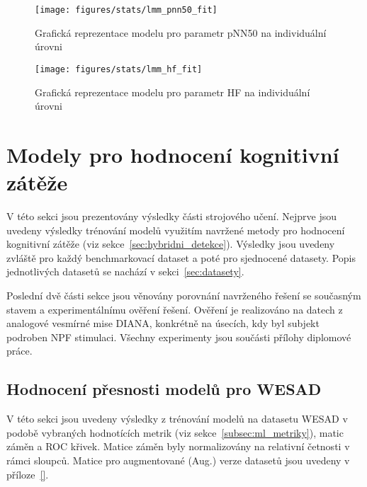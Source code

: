 \begin{figure}[!htb]
    \begin{center}
        \texttt{[image: figures/stats/lmm\_pnn50\_fit]}
        \caption{Grafická reprezentace modelu pro parametr pNN50 na individuální úrovni}
        \label{fig:results_lmm_fit3}
    \end{center}
\end{figure}

\begin{figure}[!htb]
    \begin{center}
        \texttt{[image: figures/stats/lmm\_hf\_fit]}
        \caption{Grafická reprezentace modelu pro parametr HF na individuální úrovni}
        \label{fig:results_lmm_fit4}
    \end{center}
\end{figure}



\section{Modely pro hodnocení kognitivní zátěže}
\label{sec:vysledky_detekce_cl}
V této sekci jsou prezentovány výsledky části strojového učení. Nejprve jsou
uvedeny výsledky trénování modelů využitím navržené metody pro hodnocení
kognitivní zátěže (viz sekce~\ref{sec:hybridni_detekce}). Výsledky jsou uvedeny
zvláště pro každý benchmarkovací dataset a poté pro sjednocené datasety. Popis
jednotlivých datasetů se nachází v sekci~\ref{sec:datasety}.

Poslední dvě části sekce jsou věnovány porovnání navrženého řešení se současným
stavem a experimentálnímu ověření řešení. Ověření je realizováno na datech z
analogové vesmírné mise DIANA, konkrétně na úsecích, kdy byl subjekt podroben
\gls{NPF} stimulaci. Všechny experimenty jsou součásti přílohy diplomové práce.

\subsection{Hodnocení přesnosti modelů pro WESAD}
\label{subsec:wesad_models}
V této sekci jsou uvedeny výsledky z trénování modelů na datasetu WESAD v podobě
vybraných hodnotících metrik (viz sekce~\ref{subsec:ml_metriky}), matic záměn a
ROC křivek. Matice záměn byly normalizovány na relativní četnosti v rámci
sloupců. Matice pro augmentované (Aug.) verze datasetů jsou uvedeny v
příloze~\ref{}.

